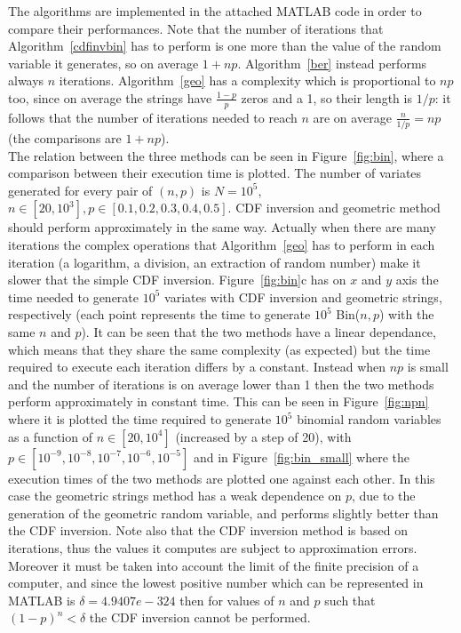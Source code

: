 \documentclass[10pt]{article}
\begin{document}
The algorithms are implemented in the attached MATLAB code in order to compare their performances. Note that the number of iterations that Algorithm~\ref{cdfinvbin} has to perform is one more than the value of the random variable it generates, so on average $1 + np$. Algorithm~\ref{ber} instead performs always $n$ iterations. Algorithm~\ref{geo} has a complexity which is proportional to $np$ too, since on average the strings have $\frac{1-p}{p}$ zeros and a 1, so their length is $1/p$: it follows that the number of iterations needed to reach $n$ are on average $\frac{n}{1/p} = np$ (the comparisons are $1+np$). \\
The relation between the three methods can be seen in Figure~\ref{fig:bin}, where a comparison between their execution time is plotted. The number of variates generated for every pair of $(n,p)$ is $N=10^5$, $n\in [20, 10^3], p \in [0.1, 0.2, 0.3, 0.4, 0.5]$. CDF inversion and geometric method should perform approximately in the same way. Actually when there are many iterations the complex operations that Algorithm~\ref{geo} has to perform in each iteration (a logarithm, a division, an extraction of random number) make it slower that the simple CDF inversion. Figure~\ref{fig:bin}c has on $x$ and $y$ axis the time needed to generate $10^5$ variates with CDF inversion and geometric strings, respectively (each point represents the time to generate $10^5$ Bin($n,p$) with the same $n$ and $p$). It can be seen that the two methods have a linear dependance, which means that they share the same complexity (as expected) but the time required to execute each iteration differs by a constant. Instead when $np$ is small and the number of iterations is on average lower than 1 then the two methods perform approximately in constant time. This can be seen in Figure~\ref{fig:npn} where it is plotted the time required to generate $10^5$ binomial random variables as a function of $n\in [20, 10^4]$ (increased by a step of 20), with $p \in [10^{-9}, 10^{-8}, 10^{-7}, 10^{-6}, 10^{-5}]$ and in Figure~\ref{fig:bin_small} where the execution times of the two methods are plotted one against each other.
In this case the geometric strings method has a weak dependence on $p$, due to the generation of the geometric random variable, and performs slightly better than the CDF inversion. Note also that the CDF inversion method is based on iterations, thus the values it computes are subject to approximation errors. Moreover it must be taken into account the limit of the finite precision of a computer, and since the lowest positive number which can be represented in MATLAB is $\delta = 4.9407e-324$ then for values of $n$ and $p$ such that $(1-p)^n < \delta$ the CDF inversion cannot be performed. \\
\end{document}
